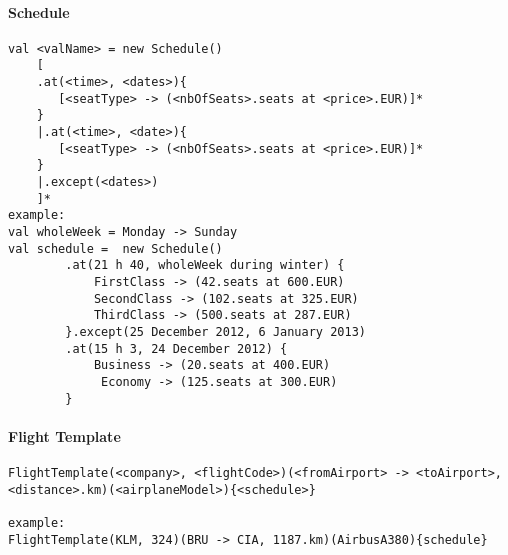 \paragraph{Schedule}\hfill
\begin{lstlisting}
val <valName> = new Schedule()
	[
	.at(<time>, <dates>){
	   [<seatType> -> (<nbOfSeats>.seats at <price>.EUR)]*
	}
	|.at(<time>, <date>){
	   [<seatType> -> (<nbOfSeats>.seats at <price>.EUR)]*
	}
	|.except(<dates>)
	]*
example:
val wholeWeek = Monday -> Sunday
val schedule =  new Schedule()
		.at(21 h 40, wholeWeek during winter) {
			FirstClass -> (42.seats at 600.EUR)
			SecondClass -> (102.seats at 325.EUR)
			ThirdClass -> (500.seats at 287.EUR)
		}.except(25 December 2012, 6 January 2013)
		.at(15 h 3, 24 December 2012) {
			Business -> (20.seats at 400.EUR)
			 Economy -> (125.seats at 300.EUR)
		}
\end{lstlisting}

\paragraph{Flight Template}\hfill
\begin{lstlisting}
FlightTemplate(<company>, <flightCode>)(<fromAirport> -> <toAirport>, <distance>.km)(<airplaneModel>){<schedule>}
		
example:
FlightTemplate(KLM, 324)(BRU -> CIA, 1187.km)(AirbusA380){schedule}
\end{lstlisting}
